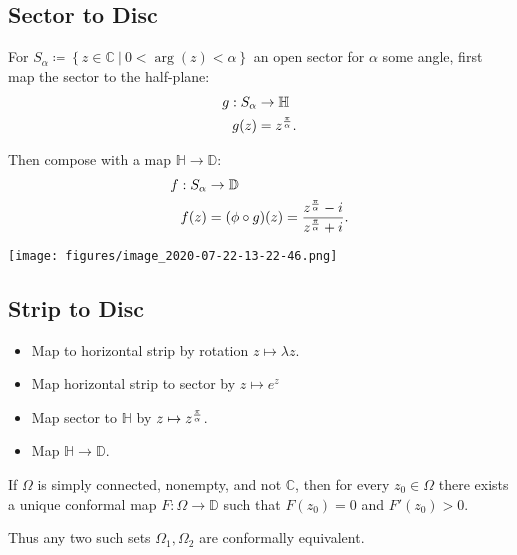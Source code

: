 \hypertarget{sector-to-disc}{%
\subsection{Sector to Disc}\label{sector-to-disc}}

For
\(S_\alpha \coloneqq\left\{{z\in{\mathbb{C}}{~\mathrel{\Big|}~}0 < \arg(z) < \alpha }\right\}\)
an open sector for \(\alpha\) some angle, first map the sector to the
half-plane:
\begin{align*} g: S_\alpha &\to {\mathbb{H}}\\ g(z) &= z^{\pi \over \alpha} .\end{align*}

Then compose with a map \({\mathbb{H}}\to{\mathbb{D}}\):
\begin{align*} f: S_\alpha &\to {\mathbb{D}}\\ f(z) &= (\phi \circ g)(z) = {z^{\pi\over \alpha} - i \over z^{\pi\over\alpha} + i} .\end{align*}

\texttt{[image: figures/image\_2020-07-22-13-22-46.png]}

\hypertarget{strip-to-disc}{%
\subsection{Strip to Disc}\label{strip-to-disc}}

\begin{itemize}
\tightlist
\item
  Map to horizontal strip by rotation \(z\mapsto \lambda z\).
\item
  Map horizontal strip to sector by \(z \mapsto e^z\)
\item
  Map sector to \({\mathbb{H}}\) by \(z\mapsto z^{\pi\over\alpha}\).
\item
  Map \({\mathbb{H}}\to{\mathbb{D}}\).
\end{itemize}

\begin{theorem}

If \(\Omega\) is simply connected, nonempty, and not \({\mathbb{C}}\),
then for every \(z_0\in \Omega\) there exists a unique conformal map
\(F:\Omega \to {\mathbb{D}}\) such that \(F(z_0) = 0\) and
\(F'(z_0) > 0\).

Thus any two such sets \(\Omega_1, \Omega_2\) are conformally
equivalent.

\end{theorem}

